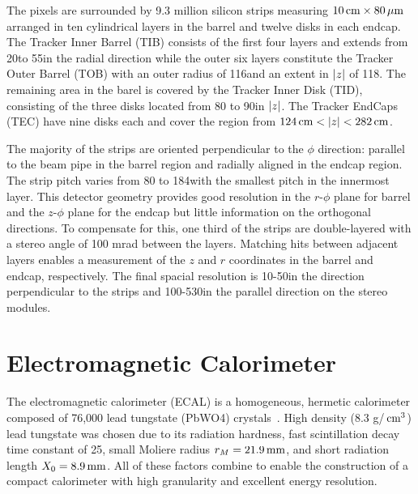 The pixels are surrounded by 9.3 million silicon strips measuring $10\,\text{cm}\times 80\,\mu\text{m}$ arranged in ten cylindrical layers in the barrel and twelve disks in each endcap.
The Tracker Inner Barrel (TIB) consists of the first four layers and extends from 20\cm to 55\cm in the radial direction while the outer six layers constitute the Tracker Outer Barrel (TOB) with an outer radius of 116\cm and an extent in $\lvert z \rvert$ of 118\cm.
The remaining area in the barel is covered by the Tracker Inner Disk (TID), consisting of the three disks located from 80 to 90\cm in $\lvert z \rvert$.
The Tracker EndCaps (TEC) have nine disks each and cover the region from $124\,\text{cm} < \lvert z \rvert < 282\,\text{cm}$.

The majority of the strips are oriented perpendicular to the $\phi$ direction: parallel to the beam pipe in the barrel region and radially aligned in the endcap region.
The strip pitch varies from 80 to 184\mum with the smallest pitch in the innermost layer.
This detector geometry provides good resolution in the $r$-$\phi$ plane for barrel and the $z$-$\phi$ plane for the endcap but little information on the orthogonal directions.
To compensate for this, one third of the strips are double-layered with a stereo angle of 100 mrad between the layers.
Matching hits between adjacent layers enables a measurement of the $z$ and $r$ coordinates in the barrel and endcap, respectively.
The final spacial resolution is 10-50\mum in the direction perpendicular to the strips and 100-530\mum in the parallel direction on the stereo modules.

\section{Electromagnetic Calorimeter}

The electromagnetic calorimeter (ECAL) is a homogeneous, hermetic calorimeter composed of 76,000 lead tungstate (PbWO4) crystals~\cite{CMS2008}.
High density (8.3 g/$\,\text{cm}^3$) lead tungstate was chosen due to its radiation hardness, fast scintillation decay time constant of 25\ns, small Moliere radius $r_M= 21.9\,\text{mm}$, and short radiation length $X_0 = 8.9\,\text{mm}$.
All of these factors combine to enable the construction of a compact calorimeter with high granularity and excellent energy resolution.

